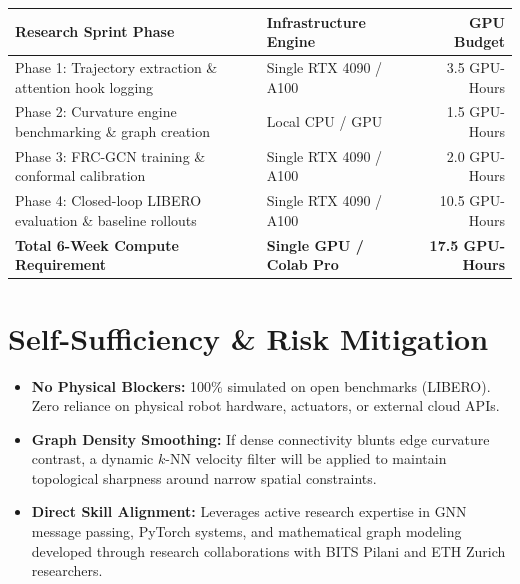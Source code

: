 \documentclass[10pt,a4paper]{article}
\begin{document}
\vspace{0.2em}
\begin{center}
\small
\begin{tabularx}{0.9\textwidth}{X l r}
\toprule
\textbf{Research Sprint Phase} & \textbf{Infrastructure Engine} & \textbf{GPU Budget} \\
\midrule
Phase 1: Trajectory extraction \& attention hook logging & Single RTX 4090 / A100 & 3.5 GPU-Hours \\
Phase 2: Curvature engine benchmarking \& graph creation & Local CPU / GPU & 1.5 GPU-Hours \\
Phase 3: FRC-GCN training \& conformal calibration & Single RTX 4090 / A100 & 2.0 GPU-Hours \\
Phase 4: Closed-loop LIBERO evaluation \& baseline rollouts & Single RTX 4090 / A100 & 10.5 GPU-Hours \\
\midrule
\textbf{Total 6-Week Compute Requirement} & \textbf{Single GPU / Colab Pro} & \textbf{17.5 GPU-Hours} \\
\bottomrule
\end{tabularx}
\end{center}

\section{Self-Sufficiency \& Risk Mitigation}

\begin{itemize}[leftmargin=1.5em, itemsep=0.2em]
    \item \textbf{No Physical Blockers:} 100\% simulated on open benchmarks (LIBERO). Zero reliance on physical robot hardware, actuators, or external cloud APIs.
    \item \textbf{Graph Density Smoothing:} If dense connectivity blunts edge curvature contrast, a dynamic $k$-NN velocity filter will be applied to maintain topological sharpness around narrow spatial constraints.
    \item \textbf{Direct Skill Alignment:} Leverages active research expertise in GNN message passing, PyTorch systems, and mathematical graph modeling developed through research collaborations with BITS Pilani and ETH Zurich researchers.
\end{itemize}
\end{document}
